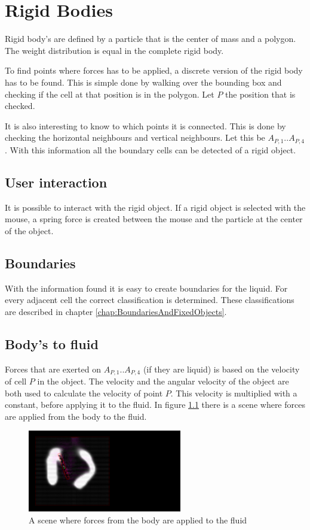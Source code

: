 \chapter{Rigid Bodies}
Rigid body's are defined by a particle that is the center of mass and a polygon. The weight distribution is equal in the complete rigid body.

To find points where forces has to be applied, a discrete version of the rigid body has to be found. This is simple done by walking over the bounding box and checking if the cell at that position is in the polygon. Let $P$ the position that is checked.

It is also interesting to know to which points it is connected. This is done by checking the horizontal neighbours and vertical neighbours. Let this be $A_{P,1} .. A_{P,4}$. With this information all the boundary cells can be detected of a rigid object.

\section{User interaction}
It is possible to interact with the rigid object. If a rigid object is selected with the mouse, a spring force is created between the mouse and the particle at the center of the object.

\section{Boundaries}
With the information found it is easy to create boundaries for the liquid. For every adjacent cell the correct classification is determined. These classifications are described in chapter \ref{chap:BoundariesAndFixedObjects}.

\section{Body's to fluid}
Forces that are exerted on $A_{P,1} .. A_{P,4}$ (if they are liquid) is based on the velocity of cell $P$ in the object. The velocity  and the angular velocity of the object are both used to calculate the velocity of point $P$. This velocity is multiplied with a constant, before applying it to the fluid. In figure \ref{fig:BodyToFluid} there is a scene where forces are applied from the body to the fluid.

\begin{figure}[htb!]
    \centering
    \includegraphics[width=0.6\textwidth]{images/BodyToFluid}
    \caption{A scene where forces from the body are applied to the fluid}
    \label{fig:BodyToFluid}
\end{figure}

